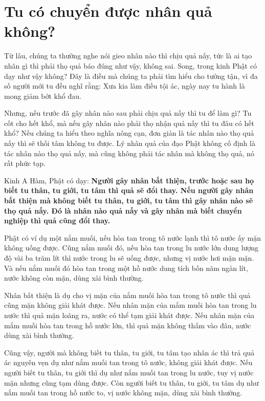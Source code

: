 \documentclass[
  12pt,
  oneside]{book}
\begin{document}
\hypertarget{tu-co-chuyen-duoc-nhan-qua-khong}{%
\chapter*{Tu có chuyển được nhân quả không?}\label{tu-co-chuyen-duoc-nhan-qua-khong}}

Từ lâu, chúng ta thường nghe nói gieo nhân nào thì chịu quả nấy, tức là ai tạo nhân gì thì phải thọ quả báo đúng như vậy, không sai. Song, trong kinh Phật có dạy như vậy không? Đây là điều mà chúng ta phải tìm hiểu cho tường tận, vì đa số người mới tu đều nghĩ rằng: Xưa kia làm điều tội ác, ngày nay tu hành là mong giảm bớt khổ đau.

Nhưng, nếu trước đã gây nhân nào sau phải chịu quả nấy thì tu để làm gì? Tu cốt cho hết khổ, mà nếu gây nhân nào phải thọ nhận quả nấy thì tu đâu có hết khổ? Nếu chúng ta hiểu theo nghĩa nông cạn, đơn giản là tác nhân nào thọ quả nấy thì sẽ thối tâm không tu được. Lý nhân quả của đạo Phật không cố định là tác nhân nào thọ quả nấy, mà cũng không phải tác nhân mà không thọ quả, nó rất phức tạp.

Kinh A Hàm, Phật có dạy: \textbf{Người gây nhân bất thiện, trước hoặc sau họ biết tu thân, tu giới, tu tâm thì quả sẽ đổi thay. Nếu người gây nhân bất thiện mà không biết tu thân, tu giới, tu tâm thì gây nhân nào sẽ thọ quả nấy. Đó là nhân nào quả nấy và gây nhân mà biết chuyển nghiệp thì quả cũng đổi thay.}

Phật có ví dụ một nắm muối, nếu hòa tan trong tô nước lạnh thì tô nước ấy mặn không uống được. Cũng nắm muối đó, nếu hòa tan trong lu nước lớn dung lượng độ vài ba trăm lít thì nước trong lu sẽ uống được, nhưng vị nước hơi mặn mặn. Và nếu nắm muối đó hòa tan trong một hồ nước dung tích bốn năm ngàn lít, nước không còn mặn, dùng xài bình thường.

Nhân bất thiện là dụ cho vị mặn của nắm muối hòa tan trong tô nước thì quả cũng mặn không giải khát được. Nếu nhân mặn của mắm muối hòa tan trong lu nước thì quả mặn loãng ra, nước có thể tạm giải khát được. Nếu nhân mặn của mắm muối hòa tan trong hồ nước lớn, thì quả mặn không thấm vào đâu, nước dùng xài bình thường.

Cũng vậy, người mà không biết tu thân, tu giới, tu tâm tạo nhân ác thì trả quả ác nguyên vẹn dụ như nắm muối tan trong tô nước, không giải khát được. Nếu người biết tu thân, tu giới thì dụ như nắm muối tan trong lu nước, tuy vị nước mặn nhưng cũng tạm dùng được. Còn người biết tu thân, tu giới, tu tâm dụ như nắm muối tan trong hồ nước to, vị nước không mặn, dùng xài bình thường.
\end{document}
